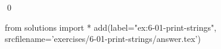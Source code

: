 
\begin{ex}
  \label{ex:6-01-print-strings}
  
  \qed
\end{ex}
\begin{python0}
from solutions import *
add(label="ex:6-01-print-strings",
    srcfilename='exercises/6-01-print-strings/answer.tex')
\end{python0}
